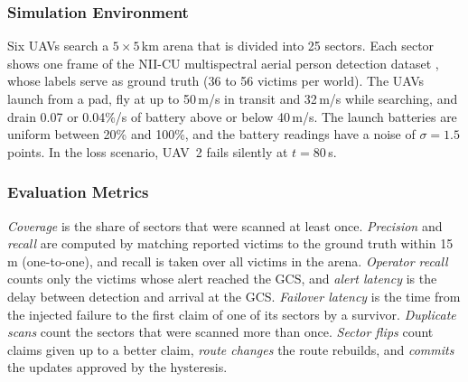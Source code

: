 \documentclass[10pt,a4paper,twocolumn]{article}
\begin{document}
\subsubsection{Simulation Environment}
Six UAVs search a $5\times5$\,km arena that is divided into 25 sectors. Each sector shows one frame of the NII-CU multispectral aerial person detection dataset \cite{speth2022}, whose labels serve as ground truth (36 to 56 victims per world). The UAVs launch from a pad, fly at up to 50\,m/s in transit and 32\,m/s while searching, and drain 0.07 or 0.04\%/s of battery above or below 40\,m/s. The launch batteries are uniform between 20\% and 100\%, and the battery readings have a noise of $\sigma=1.5$ points. In the loss scenario, UAV~2 fails silently at $t=80$\,s.

\subsubsection{Evaluation Metrics}
\emph{Coverage} is the share of sectors that were scanned at least once. \emph{Precision} and \emph{recall} are computed by matching reported victims to the ground truth within 15\,m (one-to-one), and recall is taken over all victims in the arena. \emph{Operator recall} counts only the victims whose alert reached the GCS, and \emph{alert latency} is the delay between detection and arrival at the GCS. \emph{Failover latency} is the time from the injected failure to the first claim of one of its sectors by a survivor. \emph{Duplicate scans} count the sectors that were scanned more than once. \emph{Sector flips} count claims given up to a better claim, \emph{route changes} the route rebuilds, and \emph{commits} the updates approved by the hysteresis.
\end{document}
